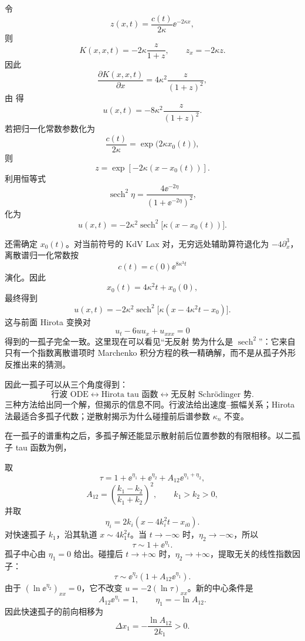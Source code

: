 令
\[
z(x,t)=\frac{c(t)}{2\kappa}\ee^{-2\kappa x},
\]
则
\[
K(x,x,t)=-2\kappa\frac{z}{1+z},
\qquad
z_x=-2\kappa z.
\]
因此
\[
\frac{\partial K(x,x,t)}{\partial x}
=4\kappa^2\frac{z}{(1+z)^2},
\]
由  得
\begin{equation}
 u(x,t)
=-8\kappa^2\frac{z}{(1+z)^2}.
\label{eq:ist-z-form}
\end{equation}
若把归一化常数参数化为
\[
\frac{c(t)}{2\kappa}
=\exp\bigl(2\kappa x_0(t)\bigr),
\]
则
\[
z=\exp[-2\kappa(x-x_0(t))].
\]
利用恒等式
\[
\operatorname{sech}^2\eta
=\frac{4\ee^{-2\eta}}{(1+\ee^{-2\eta})^2},
\]
 化为
\[
 u(x,t)
=-2\kappa^2
\operatorname{sech}^2\!\bigl[\kappa(x-x_0(t))\bigr].
\]

还需确定 $x_0(t)$。对当前符号的 KdV Lax 对，无穷远处辅助算符退化为 $-4\partial_x^3$，离散谱归一化常数按
\[
c(t)=c(0)\ee^{8\kappa^3t}
\]
演化。因此
\[
 x_0(t)=4\kappa^2t+x_0(0),
\]
最终得到
\begin{equation*}{
 u(x,t)
=-2\kappa^2
\operatorname{sech}^2
\bigl[\kappa(x-4\kappa^2t-x_0)\bigr]
}.\end{equation*}
这与前面 Hirota 变换对
\[
 u_t-6u u_x+u_{xxx}=0
\]
得到的一孤子完全一致。这里现在可以看见“无反射 势为什么是 $\operatorname{sech}^2$”：它来自只有一个指数离散谱项时 Marchenko 积分方程的秩一精确解，而不是从孤子外形反推出来的猜测。

因此一孤子可以从三个角度得到：
\[
\text{行波 ODE}
\longleftrightarrow
\text{Hirota tau 函数}
\longleftrightarrow
\text{无反射 Schrödinger 势}.
\]
三种方法给出同一个解，但揭示的信息不同。行波法给出速度--振幅关系；Hirota 法最适合多孤子代数；逆散射揭示为什么碰撞前后谱参数 $\kappa_n$ 不变。

在一孤子的谱重构之后，多孤子解还能显示散射前后位置参数的有限相移。以二孤子 tau 函数为例，

取
\[
\tau=1+\ee^{\eta_1}+\ee^{\eta_2}
+A_{12}\ee^{\eta_1+\eta_2},
\]
\[
A_{12}=
\left(\frac{k_1-k_2}{k_1+k_2}\right)^2,
\qquad k_1>k_2>0,
\]
并取
\[
\eta_i=2k_i(x-4k_i^2t-x_{i0}).
\]
对快速孤子 $k_1$，沿其轨道 $x\sim4k_1^2t$。当 $t\to-\infty$ 时，$\eta_2\to-\infty$，所以
\[
\tau\sim1+\ee^{\eta_1}.
\]
孤子中心由 $\eta_1=0$ 给出。碰撞后 $t\to+\infty$ 时，$\eta_2\to+\infty$，提取无关的线性指数因子：
\[
\tau\sim \ee^{\eta_2}
\left(1+A_{12}\ee^{\eta_1}\right).
\]
由于 $(\ln \ee^{\eta_2})_{xx}=0$，它不改变 $u=-2(\ln\tau)_{xx}$。新的中心条件是
\[
A_{12}\ee^{\eta_1}=1,
\qquad
\eta_1=-\ln A_{12}.
\]
因此快速孤子的前向相移为
\begin{equation*}{
\Delta x_1
=-\frac{\ln A_{12}}{2k_1}>0
}.\end{equation*}

